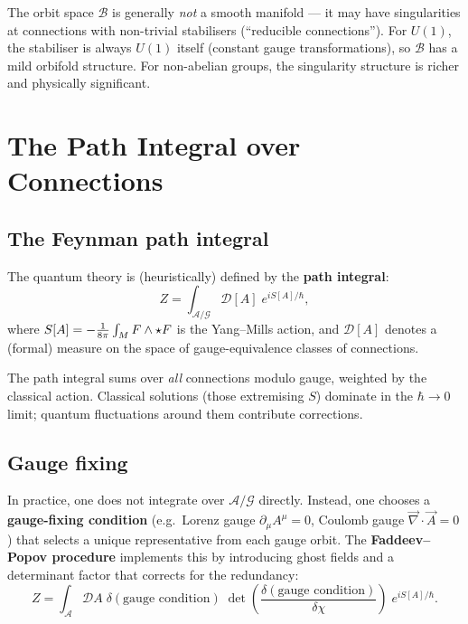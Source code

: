 \begin{remark}
The orbit space $\mathcal{B}$ is generally \emph{not} a smooth manifold --- it may have singularities at connections with non-trivial stabilisers (``reducible connections''). For $U(1)$, the stabiliser is always $U(1)$ itself (constant gauge transformations), so $\mathcal{B}$ has a mild orbifold structure. For non-abelian groups, the singularity structure is richer and physically significant.
\end{remark}

\section{The Path Integral over Connections}

\subsection{The Feynman path integral}

The quantum theory is (heuristically) defined by the \textbf{path integral}:
\begin{equation}
Z = \int_{\mathcal{A}/\mathcal{G}} \mathcal{D}[A]\; e^{iS[A]/\hbar},
\end{equation}
where $S[A] = -\frac{1}{8\pi}\int_M F \wedge \star F$ is the Yang--Mills action, and $\mathcal{D}[A]$ denotes a (formal) measure on the space of gauge-equivalence classes of connections.

The path integral sums over \emph{all} connections modulo gauge, weighted by the classical action. Classical solutions (those extremising $S$) dominate in the $\hbar \to 0$ limit; quantum fluctuations around them contribute corrections.

\subsection{Gauge fixing}

In practice, one does not integrate over $\mathcal{A}/\mathcal{G}$ directly. Instead, one chooses a \textbf{gauge-fixing condition} (e.g.\ Lorenz gauge $\partial_\mu A^\mu = 0$, Coulomb gauge $\vec{\nabla}\cdot\vec{A} = 0$) that selects a unique representative from each gauge orbit. The \textbf{Faddeev--Popov procedure} implements this by introducing ghost fields and a determinant factor that corrects for the redundancy:
\begin{equation}
Z = \int_{\mathcal{A}} \mathcal{D}A\;\delta(\text{gauge condition})\;\det\!\left(\frac{\delta(\text{gauge condition})}{\delta\chi}\right)\;e^{iS[A]/\hbar}.
\end{equation}

